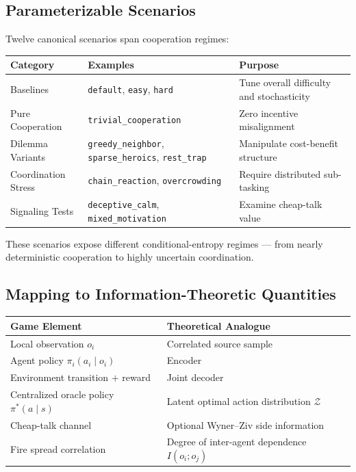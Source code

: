 \documentclass[10pt, letterpaper]{article}
\begin{document}
\subsection{Parameterizable Scenarios}

Twelve canonical scenarios span cooperation regimes:

\begin{center}
\begin{tabular}{lll}
\toprule
\textbf{Category} & \textbf{Examples} & \textbf{Purpose} \\
\midrule
Baselines & \texttt{default}, \texttt{easy}, \texttt{hard} & Tune overall difficulty and stochasticity \\
Pure Cooperation & \texttt{trivial\_cooperation} & Zero incentive misalignment \\
Dilemma Variants & \texttt{greedy\_neighbor}, \texttt{sparse\_heroics}, \texttt{rest\_trap} & Manipulate cost-benefit structure \\
Coordination Stress & \texttt{chain\_reaction}, \texttt{overcrowding} & Require distributed sub-tasking \\
Signaling Tests & \texttt{deceptive\_calm}, \texttt{mixed\_motivation} & Examine cheap-talk value \\
\bottomrule
\end{tabular}
\end{center}

These scenarios expose different conditional-entropy regimes --- from nearly deterministic cooperation to highly uncertain coordination.

\subsection{Mapping to Information-Theoretic Quantities}

\begin{center}
\begin{tabular}{ll}
\toprule
\textbf{Game Element} & \textbf{Theoretical Analogue} \\
\midrule
Local observation $o_i$ & Correlated source sample \\
Agent policy $\pi_i(a_i \mid o_i)$ & Encoder \\
Environment transition $+$ reward & Joint decoder \\
Centralized oracle policy $\pi^*(a \mid s)$ & Latent optimal action distribution $\mathcal{Z}$ \\
Cheap-talk channel & Optional Wyner--Ziv side information \\
Fire spread correlation & Degree of inter-agent dependence $I(o_i; o_j)$ \\
\bottomrule
\end{tabular}
\end{center}
\end{document}
